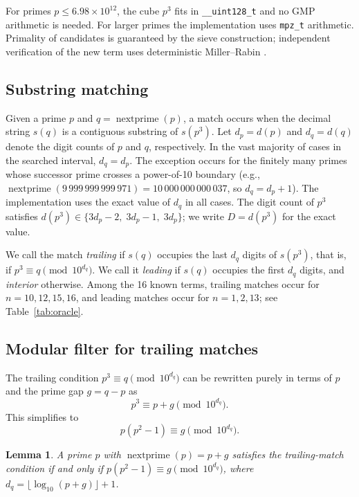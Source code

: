 \documentclass[12pt,reqno]{article}
\theoremstyle{plain}
\newtheorem{lemma}[theorem]{Lemma}
\theoremstyle{definition}
\theoremstyle{remark}
\newcommand{\np}{\operatorname{nextprime}}
\begin{document}
For primes $p \leq 6.98 \times 10^{12}$, the cube $p^3$ fits in
\texttt{\_\_uint128\_t} and no GMP arithmetic is needed.
For larger primes the implementation uses \texttt{mpz\_t} arithmetic.
Primality of candidates is guaranteed by the sieve construction;
independent verification of the new term uses deterministic
Miller--Rabin \cite{CrandallPomerance2005}.

\subsection{Substring matching}
\label{sec:matching}

Given a prime $p$ and $q = \np(p)$, a match occurs when the decimal
string $s(q)$ is a contiguous substring of $s(p^3)$.
Let $d_p = d(p)$ and $d_q = d(q)$ denote the digit counts of $p$
and $q$, respectively.
In the vast majority of cases in the searched interval, $d_q = d_p$.
The exception occurs for the finitely many primes whose successor
prime crosses a power-of-10 boundary (e.g., $\np(9\,999\,999\,999\,971)
= 10\,000\,000\,000\,037$, so $d_q = d_p + 1$).
The implementation uses the exact value of $d_q$ in all cases.
The digit count of $p^3$ satisfies
$d(p^3) \in \{3d_p - 2,\; 3d_p - 1,\; 3d_p\}$;
we write $D = d(p^3)$ for the exact value.

We call the match \emph{trailing} if $s(q)$ occupies the last $d_q$
digits of $s(p^3)$, that is, if $p^3 \equiv q \pmod{10^{d_q}}$.
We call it \emph{leading} if $s(q)$ occupies the first $d_q$ digits,
and \emph{interior} otherwise.
Among the 16 known terms, trailing matches occur for $n = 10, 12, 15,
16$, and leading matches occur for $n = 1, 2, 13$;
see Table~\ref{tab:oracle}.

\subsection{Modular filter for trailing matches}
\label{sec:filter}

The trailing condition $p^3 \equiv q \pmod{10^{d_q}}$ can be rewritten
purely in terms of $p$ and the prime gap $g = q - p$ as
\begin{equation}
 p^3 \equiv p + g \pmod{10^{d_q}}.
\label{eq:trailing}
\end{equation}
This simplifies to
\begin{equation}
 p(p^2 - 1) \equiv g \pmod{10^{d_q}}.
\label{eq:filter}
\end{equation}

\begin{lemma}
\label{lem:filter}
A prime $p$ with $\np(p) = p + g$ satisfies the trailing-match
condition if and only if $p(p^2 - 1) \equiv g \pmod{10^{d_q}}$,
where $d_q = \lfloor \log_{10}(p + g) \rfloor + 1$.
\end{lemma}
\end{document}
